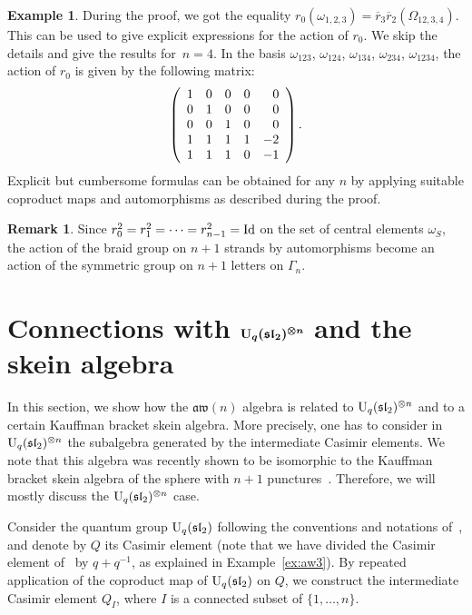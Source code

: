 \documentclass[10pt,a4paper]{amsart}
\numberwithin{equation}{section}
\theoremstyle{definition}
\newtheorem{exam}[theo]{Example}
\newtheorem{rema}[theo]{Remark}
\newcommand{\rb}{\overline{r}}
\newcommand{\aw}{\mathfrak{aw}(n)}
\begin{document}
\begin{exam}
During the proof, we got the equality $r_0(\omega_{1,2,3})=\rb_3\rb_2(\varOmega_{12,3,4})$. This can be used to give explicit expressions for the action of $r_0$. We skip the details and give the results for~${n=4}$. In the basis $\omega_{123}$, $\omega_{124}$, $\omega_{134}$, $\omega_{234}$, $\omega_{1234}$, the action of $r_0$ is given by the following matrix:
\[\left(\begin{array}{ccccc} 1 & 0 & 0 & 0 & \hphantom{-}0 \\
0 & 1 & 0 & 0 & \hphantom{-}0\\
0 & 0 & 1 & 0 & \hphantom{-}0\\
1 & 1 & 1 & 1 & -2\\
1 & 1 & 1 & 0 & -1\end{array}\right) .\]
Explicit but cumbersome formulas can be obtained for any $n$ by applying suitable coproduct maps and automorphisms as described during the proof.
\end{exam}


\begin{rema}
Since $r_0^2=r_1^2=\dots=r_{n-1}^2={\rm Id}$ on the set of central elements $\omega_S$, the action of the braid group on $n+1$ strands by automorphisms become an action of the symmetric group on $n+1$ letters on $\Gamma_n$.
\end{rema}

\section[Connections with U\_q(sl\_2)\^{}\{otimes n\} and the skein algebra]{Connections with $\boldsymbol{{\rm U}_q(\mathfrak{sl}_2)^{\otimes n}}$ and the skein algebra}\label{sec-connections}
In this section, we show how the $\aw$ algebra is related to ${\rm U}_q(\mathfrak{sl}_2)^{\otimes n}$ and to a certain Kauffman bracket skein algebra.
More precisely, one has to consider in ${\rm U}_q(\mathfrak{sl}_2)^{\otimes n}$ the subalgebra generated by the intermediate Casimir elements. We note that this algebra was recently shown to be isomorphic to the Kauffman bracket skein algebra of the sphere with $n+1$ punctures~\cite{CL}.
Therefore, we will mostly discuss the ${\rm U}_q(\mathfrak{sl}_2)^{\otimes n}$ case.

Consider the quantum group ${\rm U}_q(\mathfrak{sl}_2)$ following the conventions and notations of~\cite{avatar}, and denote by $Q$ its Casimir element (note that we have divided the Casimir element of~\cite{avatar} by $q+q^{-1}$, as explained in Example~\ref{ex:aw3}). By repeated application of the coproduct map of ${\rm U}_q(\mathfrak{sl}_2)$ on $Q$,
we construct the intermediate Casimir element $Q_I$, where $I$ is a connected subset of $\{1,\dots,n\}$.
\end{document}
